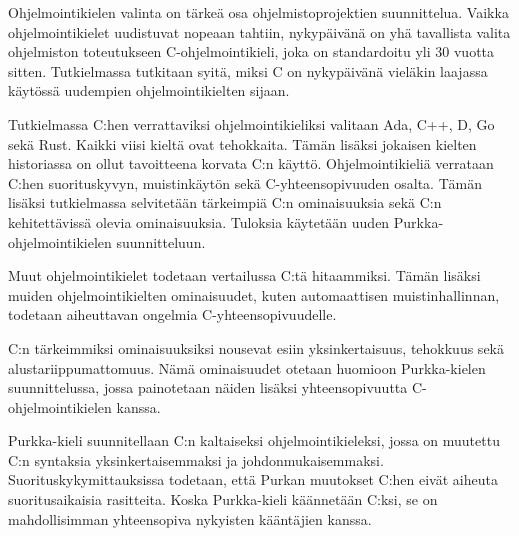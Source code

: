Ohjelmointikielen valinta on tärkeä osa ohjelmistoprojektien suunnittelua.
Vaikka ohjelmointikielet uudistuvat nopeaan tahtiin, nykypäivänä on yhä
tavallista valita ohjelmiston toteutukseen C-ohjelmointikieli, joka on
standardoitu yli 30 vuotta sitten. Tutkielmassa tutkitaan syitä, miksi C on
nykypäivänä vieläkin laajassa käytössä uudempien ohjelmointikielten sijaan.

Tutkielmassa C:hen verrattaviksi ohjelmointikieliksi valitaan Ada, C++, D,
Go sekä Rust. Kaikki viisi kieltä ovat tehokkaita. Tämän lisäksi jokaisen
kielten historiassa on ollut tavoitteena korvata C:n käyttö.
Ohjelmointikieliä verrataan C:hen suorituskyvyn, muistinkäytön sekä
C-yhteensopivuuden osalta. Tämän lisäksi tutkielmassa selvitetään
tärkeimpiä C:n ominaisuuksia sekä C:n kehitettävissä olevia ominaisuuksia.
Tuloksia käytetään uuden Purkka-ohjelmointikielen suunnitteluun.

Muut ohjelmointikielet todetaan vertailussa C:tä hitaammiksi. Tämän lisäksi
muiden ohjelmointikielten ominaisuudet, kuten automaattisen
muistinhallinnan, todetaan aiheuttavan ongelmia C-yhteensopivuudelle.

C:n tärkeimmiksi ominaisuuksiksi nousevat esiin yksinkertaisuus, tehokkuus
sekä alustariippumattomuus. Nämä ominaisuudet otetaan huomioon
Purkka-kielen suunnittelussa, jossa painotetaan näiden lisäksi
yhteensopivuutta C-ohjelmointikielen kanssa.

Purkka-kieli suunnitellaan C:n kaltaiseksi ohjelmointikieleksi, jossa on
muutettu C:n syntaksia yksinkertaisemmaksi ja johdonmukaisemmaksi.
Suorituskykymittauksissa todetaan, että Purkan muutokset C:hen eivät
aiheuta suoritusaikaisia rasitteita. Koska Purkka-kieli käännetään C:ksi,
se on mahdollisimman yhteensopiva nykyisten kääntäjien kanssa.
